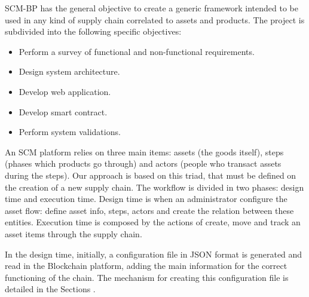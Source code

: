 \label{chap:Technical}

\acresetall 

\ac{SCM-BP} has the general objective to create a generic framework intended to be used in any kind of supply chain correlated to assets and products. The project is subdivided into the following specific objectives:
\begin{itemize}
\item Perform a survey of functional and non-functional requirements.
\item Design system architecture.
\item Develop web application.
\item Develop smart contract.
\item Perform system validations.
\end{itemize}


An SCM platform relies on three main items: assets (the goods itself), steps (phases which products go through) and actors (people who transact assets during the steps). Our approach is based on this triad, that must be defined on the creation of a new supply chain. The workflow is divided in two phases: design time and execution time. Design time is when an administrator configure the asset flow: define asset info, steps, actors and create the relation between these entities. Execution time is composed by the actions of create, move and track an asset items through the supply chain. 

In the design time, initially, a configuration file in JSON format is generated and read in the Blockchain platform, adding the main information for the correct functioning of the chain. The mechanism for creating this configuration file is detailed in the Sections .




%



